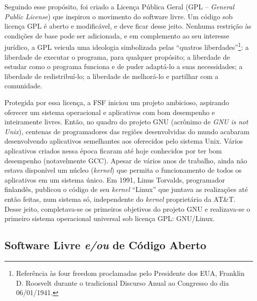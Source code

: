 Seguindo esse propósito, foi criado a Licença Pública Geral (GPL – \emph{General Public License}) que inspirou o movimento do software livre. Um código sob licença GPL é aberto e modificável, e deve ficar desse jeito. Nenhuma restrição às condições de base pode ser adicionada, e em complemento ao seu interesse jurídico, a GPL veicula uma ideologia simbolizada pelas “quatros liberdades”\footnote{Referência às four freedom proclamadas pelo Presidente dos EUA, Franklin D. Roosvelt durante o tradicional Discurso Anual ao Congresso do dia 06/01/1941.}: a liberdade de executar o programa, para qualquer propósito; a liberdade de estudar como o programa funciona e de puder adaptá-lo a suas necessidades; a liberdade de redistribuí-lo; a liberdade de melhorá-lo e partilhar com a comunidade.

Protegida por essa licença, a FSF iniciou um projeto ambicioso, aspirando oferecer um sistema operacional e aplicativos com bom desempenho e inteiramente livres. Então, no quadro do projeto GNU (acrônimo de \emph{GNU is not Unix}), centenas de programadores das regiões desenvolvidas do mundo acabaram desenvolvendo aplicativos semelhantes aos oferecidos pelo sistema Unix. Vários aplicativos criados nessa época ficaram até hoje conhecidos por ter bom desempenho (notavelmente GCC). Apesar de vários anos de trabalho, ainda não estava disponível um núcleo (\emph{kernel}) que permita o funcionamento de todos os aplicativos em um sistema único. Em 1991, Linus Torvalds, programador finlandês, publicou o código de seu \emph{kernel} “Linux” que juntava as realizações até então feitas, num sistema só, independente do \emph{kernel} proprietário da AT\&T. Desse jeito, completava-se os primeiros objetivos do projeto GNU e realizava-se o primeiro sistema operacional universal sob licença GPL: GNU/Linux. 

\subsection{Software Livre \emph{e/ou} de Código Aberto} \label{1.3.2}

